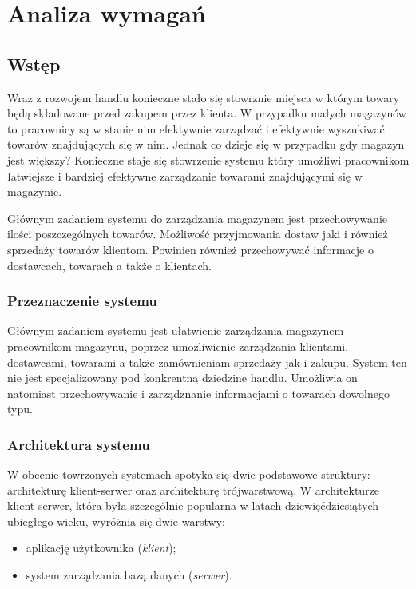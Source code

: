 \chapter{Analiza wymagań}

\section{Wstęp}


Wraz z rozwojem handlu konieczne stało się stowrznie miejsca w którym towary
będą składowane przed zakupem  przez klienta. W przypadku małych magazynów to
pracownicy są w stanie nim efektywnie zarządzać i efektywnie wyszukiwać towarów
znajdujących się w nim. Jednak co dzieje się w przypadku gdy magazyn jest
większy? Konieczne staje się stowrzenie systemu który umożliwi pracownikom
łatwiejsze i bardziej efektywne zarządzanie towarami znajdującymi się w
magazynie.

Głównym zadaniem systemu do zarządzania magazynem jest przechowywanie ilości
poszczególnych towarów. Możliwość przyjmowania dostaw jaki i również sprzedaży
towarów klientom. Powinien również przechowywać informacje o dostawcach,
towarach a także o klientach.

\subsection{Przeznaczenie systemu}

Głównym zadaniem systemu jest ułatwienie zarządzania magazynem pracownikom
magazynu, poprzez umożliwienie zarządzania klientami, dostawcami, towarami a
także zamównieniam sprzedaży jak i zakupu. System ten nie jest specjalizowany
pod konkrentną dziedzine handlu. Umożliwia on natomiast przechowywanie i
zarządznanie informacjami o towarach dowolnego typu. 

\subsection{Architektura systemu}

W obecnie towrzonych systemach spotyka się dwie podstawowe struktury:
architekturę klient-serwer oraz architekturę trójwarstwową.
W architekturze klient-serwer, która była szczególnie popularna w
latach dziewięćdziesiątych ubiegłego wieku, wyróżnia się
dwie warstwy: 
\begin{itemize}
 \item aplikację użytkownika (\emph{klient});
 \item system zarządzania bazą danych (\emph{serwer}).
\end{itemize}

